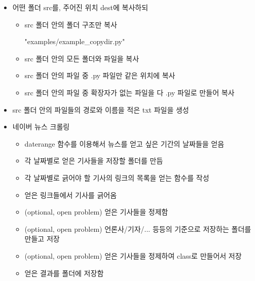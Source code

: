 \documentclass[twoside]{article}
\begin{document}
\begin{itemize}
\item 어떤 폴더 src를, 주어진 위치 dest에 복사하되
\begin{itemize}
\item src 폴더 안의 폴더 구조만 복사 

                {"examples/example_copydir.py"}
\item src 폴더 안의 모든 폴더와 파일을 복사 
\item src 폴더 안의 파일 중 .py 파일만 같은 위치에 복사 
\item src 폴더 안의 파일 중 확장자가 없는 파일을 다 .py 파일로 만들어 복사 
\end{itemize}
\item src 폴더 안의 파일들의 경로와 이름을 적은 txt 파일을 생성 
\item 네이버 뉴스 크롤링
\begin{itemize}
\item daterange 함수를 이용해서 뉴스를 얻고 싶은 기간의 날짜들을 얻음 
\item 각 날짜별로 얻은 기사들을 저장할 폴더를 만듬 
\item 각 날짜별로 긁어야 할 기사의 링크의 목록을 얻는 함수를 작성 
\item 얻은 링크들에서 기사를 긁어옴 
\item (optional, open problem) 얻은 기사들을 정제함
\item (optional, open problem) 언론사/기자/... 등등의 기준으로 저장하는 폴더를 만들고 저장
\item (optional, open problem) 얻은 기사들을 정제하여 class로 만들어서 저장 
\item 얻은 결과를 폴더에 저장함 
\end{itemize}
\end{itemize}













                
                

\end{document}
